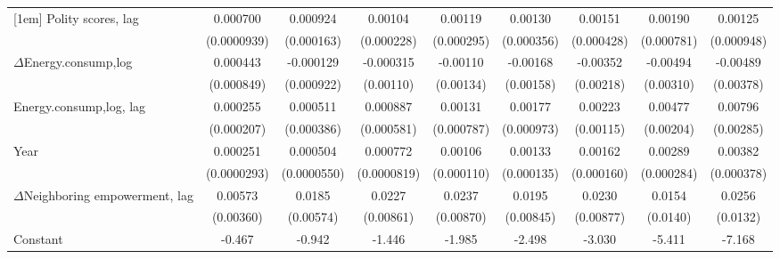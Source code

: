 \begin{table}[htbp]
\begin{tabular}{l*{8}{c}}
[1em]
Polity scores, lag           &    0.000700\sym{***}&    0.000924\sym{***}&     0.00104\sym{***}&     0.00119\sym{***}&     0.00130\sym{***}&     0.00151\sym{***}&     0.00190\sym{**} &     0.00125         \\
                    & (0.0000939)         &  (0.000163)         &  (0.000228)         &  (0.000295)         &  (0.000356)         &  (0.000428)         &  (0.000781)         &  (0.000948)         \\
[1em]
$\Delta$Energy.consump,log           &    0.000443         &   -0.000129         &   -0.000315         &    -0.00110         &    -0.00168         &    -0.00352         &    -0.00494         &    -0.00489         \\
                    &  (0.000849)         &  (0.000922)         &   (0.00110)         &   (0.00134)         &   (0.00158)         &   (0.00218)         &   (0.00310)         &   (0.00378)         \\
[1em]
Energy.consump,log, lag             &    0.000255         &    0.000511         &    0.000887         &     0.00131\sym{*}  &     0.00177\sym{*}  &     0.00223\sym{*}  &     0.00477\sym{**} &     0.00796\sym{***}\\
                    &  (0.000207)         &  (0.000386)         &  (0.000581)         &  (0.000787)         &  (0.000973)         &   (0.00115)         &   (0.00204)         &   (0.00285)         \\
[1em]
Year                &    0.000251\sym{***}&    0.000504\sym{***}&    0.000772\sym{***}&     0.00106\sym{***}&     0.00133\sym{***}&     0.00162\sym{***}&     0.00289\sym{***}&     0.00382\sym{***}\\
                    & (0.0000293)         & (0.0000550)         & (0.0000819)         &  (0.000110)         &  (0.000135)         &  (0.000160)         &  (0.000284)         &  (0.000378)         \\
[1em]
$\Delta$Neighboring empowerment, lag&     0.00573         &      0.0185\sym{***}&      0.0227\sym{***}&      0.0237\sym{***}&      0.0195\sym{**} &      0.0230\sym{***}&      0.0154         &      0.0256\sym{*}  \\
                    &   (0.00360)         &   (0.00574)         &   (0.00861)         &   (0.00870)         &   (0.00845)         &   (0.00877)         &    (0.0140)         &    (0.0132)         \\
[1em]
Constant            &      -0.467\sym{***}&      -0.942\sym{***}&      -1.446\sym{***}&      -1.985\sym{***}&      -2.498\sym{***}&      -3.030\sym{***}&      -5.411\sym{***}&      -7.168\sym{***}\\

\end{tabular}
\end{table}
